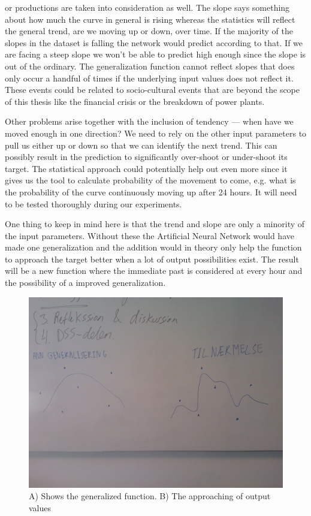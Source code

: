 or productions are taken into consideration as well. The slope says something about how much the curve in general is rising whereas the statistics will reflect the general trend, are we moving up or down, over time. If the majority of the slopes in the dataset is falling the network would predict according to that. If we are facing a steep slope we won't be able to predict high enough since the slope is out of the ordinary. The generalization function cannot reflect slopes that does only occur a handful of times if the underlying input values does not reflect it. These events could be related to socio-cultural events that are beyond the scope of this thesis like the financial crisis or the breakdown of power plants.

Other problems arise together with the inclusion of tendency --- when have we moved enough in one direction? We need to rely on the other input parameters to pull us either up or down so that we can identify the next trend. This can possibly result in the prediction to significantly over-shoot or under-shoot its target. The statistical approach could potentially help out even more since it gives us the tool to calculate probability of the movement to come, e.g. what is the probability of the curve continuously moving up after 24 hours. It will need to be tested thoroughly during our experiments. 

One thing to keep in mind here is that the trend and slope are only a minority of the input parameters. Without these the Artificial Neural Network would have made one generalization and the addition would in theory only help the function to approach the target better when a lot of output possibilities exist. The result will be a new function where the immediate past is considered at every hour and the possibility of a improved generalization.

\begin{figure}[H]
\centering
\includegraphics[width=0.99\linewidth,natwidth=898,natheight=587]{billeder/WP_000057.jpg}
\caption{A) Shows the generalized function. B) The approaching of output values}
\label{fig:WP}
\end{figure}

